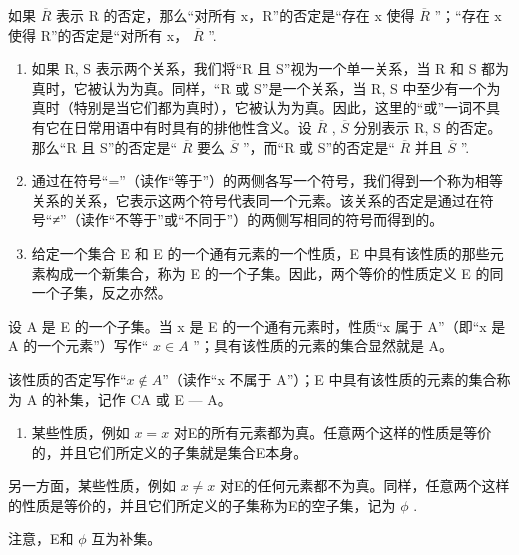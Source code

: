 如果 \(\overline{R}\) 表示 R 的否定，那么“对所有 x，R”的否定是“存在 x 使得 \(\overline{R}\) ”；“存在 x 使得 R”的否定是“对所有 x， \(\overline{R}\) ''.

\begin{enumerate}
\def\labelenumi{\arabic{enumi}.}
\setcounter{enumi}{4}
\item
  如果 R, S 表示两个关系，我们将“R 且 S”视为一个单一关系，当 R 和 S 都为真时，它被认为为真。同样，“R 或 S”是一个关系，当 R, S 中至少有一个为真时（特别是当它们都为真时），它被认为为真。因此，这里的“或”一词不具有它在日常用语中有时具有的排他性含义。设 \(\overline{R}\) , \(\overline{S}\) 分别表示 R, S 的否定。那么“R 且 S”的否定是“ \(\overline{R}\) 要么 \(\overline{S}\) ”，而“R 或 S”的否定是“ \(\overline{R}\) 并且 \(\overline{S}\) ''.
\item
  通过在符号“=”（读作“等于”）的两侧各写一个符号，我们得到一个称为相等关系的关系，它表示这两个符号代表同一个元素。该关系的否定是通过在符号“≠”（读作“不等于”或“不同于”）的两侧写相同的符号而得到的。
\item
  给定一个集合 E 和 E 的一个通有元素的一个性质，E 中具有该性质的那些元素构成一个新集合，称为 E 的一个子集。因此，两个等价的性质定义 E 的同一个子集，反之亦然。
\end{enumerate}

设 A 是 E 的一个子集。当 x 是 E 的一个通有元素时，性质“x 属于 A”（即“x 是 A 的一个元素”）写作“ \(x \in A\) ”；具有该性质的元素的集合显然就是 A。

该性质的否定写作“\(x \notin A\)”（读作“x 不属于 A”）；E 中具有该性质的元素的集合称为 A 的补集，记作 CA 或 E --- A。

\begin{enumerate}
\def\labelenumi{\arabic{enumi}.}
\setcounter{enumi}{7}
\tightlist
\item
  某些性质，例如 \(x = x\) 对E的所有元素都为真。任意两个这样的性质是等价的，并且它们所定义的子集就是集合E本身。
\end{enumerate}

另一方面，某些性质，例如 \(x \neq x\) 对E的任何元素都不为真。同样，任意两个这样的性质是等价的，并且它们所定义的子集称为E的空子集，记为 \(\phi\) .

注意，E和 \(\phi\) 互为补集。

